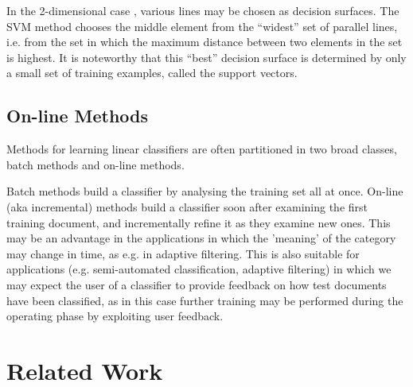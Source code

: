 In the 2-dimensional case , various lines may be chosen as decision surfaces. The SVM method chooses the middle element from the “widest” set of parallel lines, i.e. from the set in which the maximum distance between two elements in the set is highest. It is noteworthy that this “best” decision surface is determined by only a small set of training examples, called the support vectors.

\subsection{On-line Methods}
Methods for learning linear classifiers are often partitioned in two broad classes, batch methods and on-line methods.

Batch methods build a classifier by analysing the training set all at once. On-line (aka incremental) methods build a classifier soon after examining the first training document, and incrementally refine it as they examine new ones. This may be an advantage in the applications in which the 'meaning' of the category may change in time, as e.g. in adaptive filtering. This is also suitable for applications (e.g. semi-automated classification, adaptive filtering) in which we may expect the user of a classifier to provide feedback on how test documents have been classified, as in this case further training may be performed during the operating phase by exploiting user feedback.

\section{Related Work}

